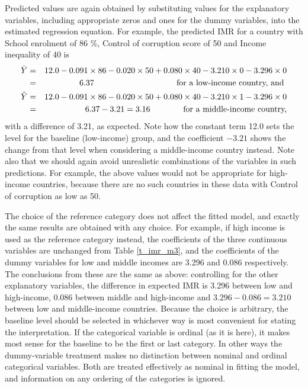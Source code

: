 Predicted values are again obtained by substituting values for the
explanatory variables, including appropriate zeros and ones for the
dummy variables, into the estimated regression equation. For example,
the predicted IMR for a country with
School enrolment of 86 \%,
Control of corruption score of 50 and
Income inequality of 40 is
\begin{eqnarray*}
\hat{Y}&=&12.0-0.091\times 86-0.020\times 50+0.080\times 40-3.210\times
0-3.296\times 0\\
&=&
6.37 \hspace*{10em}\text{for a low-income country, and }\\
\hat{Y}&=&12.0-0.091\times 86-0.020\times 50+0.080\times 40-3.210\times
1-3.296\times 0\\
&=&
6.37-3.21=3.16 \hspace*{4em}\text{for a middle-income country,}
\end{eqnarray*}
with a difference of 3.21, as expected. Note how the constant term 12.0
sets the level for the baseline (low-income) group, and the coefficient
$-3.21$ shows the change from that level when considering a middle-income
country instead. Note also that we should again avoid unrealistic
combinations of the variables in such predictions. For example, the
above values would not be appropriate for high-income countries,
because there are no such countries in these data
with Control of corruption as low as
50.

The choice of the reference category does not affect the fitted model,
and exactly the same results are obtained with any choice. For example,
if high income is used as the reference category instead, the coefficients
of the three continuous variables are unchanged from Table
\ref{t_imr_m3}, and the coefficients of the dummy variables for low and
middle incomes are 3.296 and 0.086 respectively. The conclusions
from these are the same as above: controlling for the other explanatory
variables, the difference in expected IMR is 3.296 between low
and high-income, 0.086 between middle and high-income and
$3.296-0.086=3.210$ between low and middle-income countries. Because the
choice is arbitrary, the baseline level  should be selected in whichever
way is most convenient for stating the interpretation. If the
categorical variable is ordinal (as it is here), it makes most sense for
the baseline to be the first or last category. In other ways the
dummy-variable treatment makes no distinction between nominal and
ordinal categorical variables. Both are treated effectively as nominal
in fitting the model, and information on any ordering of the categories
is ignored.

